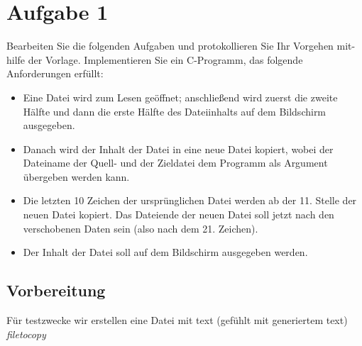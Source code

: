 \section{Aufgabe 1}
Bearbeiten Sie die folgenden Aufgaben und protokollieren Sie Ihr Vorgehen mit-
hilfe der Vorlage.
Implementieren Sie ein C-Programm, das folgende Anforderungen erfüllt:
\begin{itemize}
	\item Eine Datei wird zum Lesen geöffnet; anschließend wird zuerst die zweite
	Hälfte und dann die erste Hälfte des Dateiinhalts auf dem Bildschirm ausgegeben.
	\item  Danach wird der Inhalt der Datei in eine neue Datei kopiert, wobei der Dateiname der
Quell- und der Zieldatei dem Programm als Argument übergeben	werden kann.
\item  Die letzten 10 Zeichen der ursprünglichen Datei werden ab der 11. Stelle der neuen Datei
kopiert. Das Dateiende der neuen Datei soll jetzt nach den verschobenen Daten sein (also
nach dem 21. Zeichen).
\item Der Inhalt der Datei soll auf dem Bildschirm ausgegeben werden.


\end{itemize}

	\subsection{Vorbereitung}
	Für testzwecke wir erstellen eine Datei mit text (gefühlt mit generiertem text)
	\textit{filetocopy}
